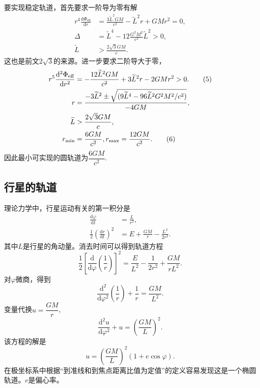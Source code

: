 \documentclass[11pt, a4paper, oneside, onecolumn]{ctexart}
\numberwithin{equation}{subsection}
\begin{document}
要实现稳定轨道，首先要求一阶导为零有解
\begin{align}
r^{4}\frac{\mathrm{d}\Phi_{\text{eff}}}{\mathrm{d}r}&=\frac{3\widetilde{L}^{2}GM}{c^{2}}-\widetilde{L}^{2}r+GMr^{2}=0,\\
\Delta{}&=\widetilde{L}^{4}-12\frac{G^{2}M^{2}}{c^{2}}\widetilde{L}^{2}>0,\\
\widetilde{L}&>\frac{2\sqrt{3}GM}{c}.
\end{align}
这也是前文$2\sqrt{3}$的来源。进一步要求二阶导大于零，
\begin{align}
r^{5}\frac{\mathrm{d}^{2}\Phi_{\text{eff}}}{\mathrm{d}r^{2}}&=-\frac{12\widetilde{L}^{2}GM}{c^{2}}+3\widetilde{L}^{2}r-2GMr^{2}>0.\tag{5}\\
r&=\frac{-3\widetilde{L}^{2}\pm\sqrt{(9\widetilde{L}^{4}-96\widetilde{L}^{2}G^{2}M^{2}/c^{2})}}{-4GM},\notag\\
\widetilde{L}&>\frac{2\sqrt3GM}{c},\notag\\
r_{\min}&=\frac{6GM}{c^{2}},r_{\max}=\frac{12GM}{c^{2}}.\tag{6}
\end{align}
因此最小可实现的圆轨道为$\dfrac{6GM}{c^{2}}$.

\subsection{行星的轨道}
理论力学中，行星运动有关的第一积分是
\begin{align}
\frac{\mathrm{d}\varphi}{\mathrm{d}t}&=\frac{L}{r^{2}},\\
\frac12\left(\frac{\mathrm{d}r}{\mathrm{d}t}\right)^{2}&=E+\frac{GM}{r}-\frac{L^{2}}{2r^{2}}.
\end{align}
其中$L$是行星的角动量。消去时间可以得到轨道方程
\begin{equation}
\frac{1}{2}\left[\frac{\mathrm{d}}{\mathrm{d}\varphi}\left(\frac{1}{r}\right)\right]^{2}=\frac{E}{L^{2}}-\frac{1}{2r^{2}}+\frac{GM}{rL^{2}}.
\end{equation}
对$\varphi$微商，得到
\begin{equation}
\frac{\mathrm{d}^{2}}{\mathrm{d}\varphi^{2}}\left(\frac{1}{r}\right)+\frac{1}{r}=\frac{GM}{L^{2}}.
\end{equation}
变量代换$u=\dfrac{GM}{r}$,
\begin{equation}
\frac{\mathrm{d}^{2}u}{\mathrm{d}\varphi^{2}}+u=\left(\frac{GM}{L}\right)^{2}.
\end{equation}
该方程的解是
\begin{equation}
u=\left(\frac{GM}{L}\right)^{2}\left(1+e\cos\varphi\right).
\end{equation}
在极坐标系中根据“到准线和到焦点距离比值为定值”的定义容易发现这是一个椭圆轨道。$e$是偏心率。
\end{document}
